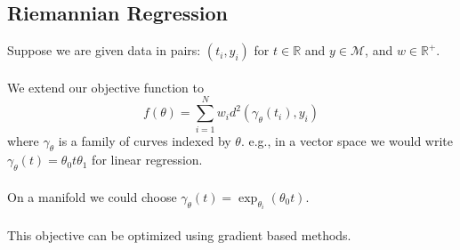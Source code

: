 \documentclass[10pt]{article}
\newcommand{\R}{\mathbb{R}}
\begin{document}
\subsection*{Riemannian Regression}
Suppose we are given data in pairs: $(t_i, y_i)$ for $t \in \R$ and $y \in \mathcal{M}$, and $w \in \R^+$.\\\\
We extend our objective function to
\[f(\theta) = \sum_{i = 1}^N w_i d^2 (\gamma_\theta (t_i), y_i)\]
where $\gamma_\theta$ is a family of curves indexed by $\theta$.  e.g., in a vector space we would write $\gamma_\theta(t) = \theta_0 t \theta_1$ for linear regression.\\\\
On a manifold we could choose $\gamma_\theta(t) = \exp_{\theta_i}(\theta_0 t)$.\\\\
This objective can be optimized using gradient based methods.
\end{document}
